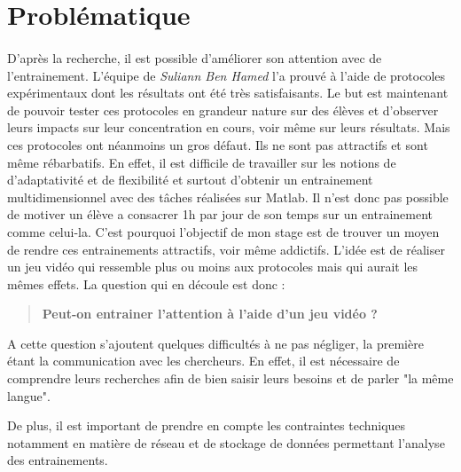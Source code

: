 \section{Problématique}

\paragraph{}D'après la recherche, il est possible d'améliorer son attention avec de l'entrainement. L'équipe de \emph{Suliann Ben Hamed} l'a prouvé à l'aide de protocoles expérimentaux
dont les résultats ont été très satisfaisants. Le but est maintenant de pouvoir tester ces protocoles en grandeur nature sur des élèves et d'observer leurs impacts sur leur
concentration en cours, voir même sur leurs résultats. Mais ces protocoles ont néanmoins un gros défaut. Ils ne sont pas attractifs et sont même rébarbatifs. En effet, il est difficile
de travailler sur les notions de d'adaptativité et de flexibilité et surtout d'obtenir un entrainement multidimensionnel avec des tâches réalisées sur \gls{Matlab}. Il n'est donc pas
possible de motiver un élève a consacrer 1h par jour de son temps sur un entrainement comme celui-la. C'est pourquoi l'objectif de mon stage est de trouver un moyen de rendre ces
entrainements attractifs, voir même addictifs. L'idée est de réaliser un jeu vidéo qui ressemble plus ou moins aux protocoles mais qui aurait les mêmes effets. La question qui en
découle est donc :
\begin{quote}
\textbf{Peut-on entrainer l'attention à l'aide d'un jeu vidéo ?}
\end{quote}

A cette question s'ajoutent quelques difficultés à ne pas négliger, la première étant la communication avec les chercheurs. En effet, il est nécessaire de comprendre leurs
recherches afin de bien saisir leurs besoins et de parler "la même langue".

De plus, il est important de prendre en compte les contraintes techniques notamment en matière de réseau et de stockage de données permettant l'analyse des entrainements.


\newpage